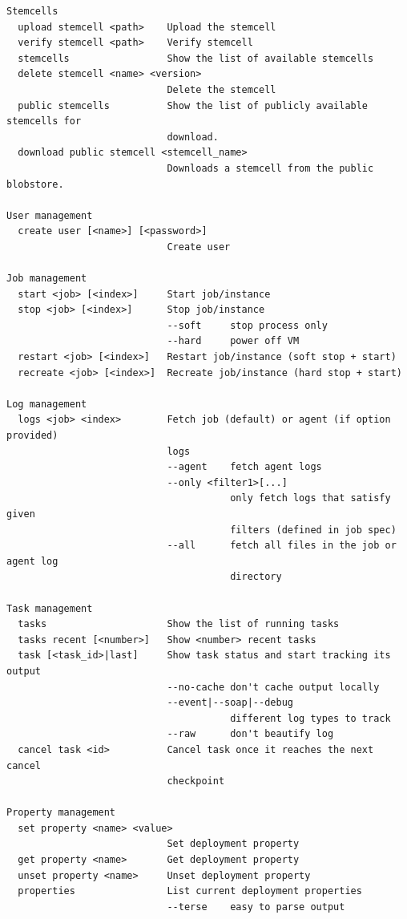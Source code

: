 \begin{adjustwidth}{2.5em}{2.5em}
\begin{verbatim}
Stemcells
  upload stemcell <path>    Upload the stemcell 
  verify stemcell <path>    Verify stemcell 
  stemcells                 Show the list of available stemcells 
  delete stemcell <name> <version> 
                            Delete the stemcell 
  public stemcells          Show the list of publicly available stemcells for 
                            download. 
  download public stemcell <stemcell_name> 
                            Downloads a stemcell from the public blobstore. 

User management
  create user [<name>] [<password>] 
                            Create user 

Job management
  start <job> [<index>]     Start job/instance 
  stop <job> [<index>]      Stop job/instance 
                            --soft     stop process only 
                            --hard     power off VM 
  restart <job> [<index>]   Restart job/instance (soft stop + start) 
  recreate <job> [<index>]  Recreate job/instance (hard stop + start) 

Log management
  logs <job> <index>        Fetch job (default) or agent (if option provided) 
                            logs 
                            --agent    fetch agent logs 
                            --only <filter1>[...] 
                                       only fetch logs that satisfy given 
                                       filters (defined in job spec) 
                            --all      fetch all files in the job or agent log 
                                       directory 

Task management
  tasks                     Show the list of running tasks 
  tasks recent [<number>]   Show <number> recent tasks 
  task [<task_id>|last]     Show task status and start tracking its output 
                            --no-cache don't cache output locally 
                            --event|--soap|--debug 
                                       different log types to track 
                            --raw      don't beautify log 
  cancel task <id>          Cancel task once it reaches the next cancel 
                            checkpoint 

Property management
  set property <name> <value> 
                            Set deployment property 
  get property <name>       Get deployment property 
  unset property <name>     Unset deployment property 
  properties                List current deployment properties 
                            --terse    easy to parse output 


\end{verbatim}
\end{adjustwidth}

